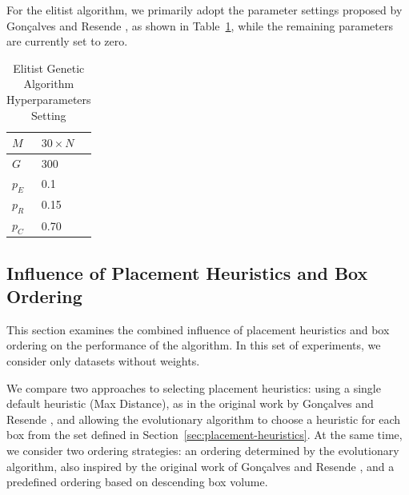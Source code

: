 For the elitist algorithm, we primarily adopt the parameter settings proposed by Gonçalves and Resende \cite{goncalves2013}, 
as shown in Table~\ref{tab:ega-set-hyperparameters}, while the remaining parameters are currently set to zero.

\begin{table}[htbp]
\centering
\caption{Elitist Genetic Algorithm Hyperparameters Setting}
\label{tab:ega-set-hyperparameters}
\begin{tabular}{|l|l|}
\hline
$M$ & $30 \times N$ \\ \hline
$G$ & 300 \\ \hline
$p_E$ & 0.1 \\ \hline
$p_R$ & 0.15 \\ \hline
$p_C$ & 0.70 \\ \hline
\end{tabular}
\end{table}

\subsection{Influence of Placement Heuristics and Box Ordering}

This section examines the combined influence of placement heuristics 
and box ordering on the performance of the algorithm. 
In this set of experiments, we consider only datasets without weights.

We compare two approaches to selecting placement heuristics: 
using a single default heuristic (Max Distance), as in the original work by Gonçalves and Resende \cite{goncalves2013}, 
and allowing the evolutionary algorithm to choose a heuristic for each box from the set defined in 
Section~\ref{sec:placement-heuristics}. 
At the same time, we consider two ordering strategies: 
an ordering determined by the evolutionary algorithm, also inspired by the original work of Gonçalves and Resende \cite{goncalves2013}, 
and a predefined ordering based on descending box volume.

